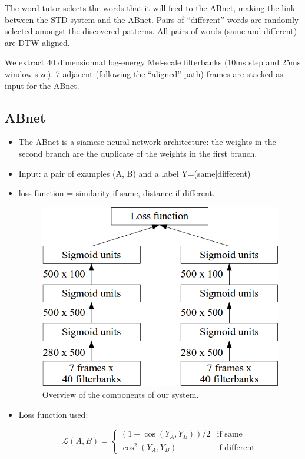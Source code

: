 \documentclass[final]{beamer}
\newcommand{\abnet}{{\sc ABnet}}
\begin{document}
\begin{frame}[t]
\begin{multicols}{3}
The word tutor selects the words that it will feed to the \abnet{}, making the link between the STD system and the \abnet{}.
Pairs of ``different'' words are randomly selected amongst the discovered patterns. All pairs of words (same and different) are DTW aligned.

We extract 40 dimensionnal log-energy Mel-scale filterbanks (10ms step and 25ms window size). 7 adjacent (following the ``aligned'' path) frames are stacked as input for the \abnet{}.

\subsection{ABnet}

\begin{itemize}
\item The \abnet{} is a siamese neural network architecture: the weights in the second branch are the duplicate of the weights in the first branch.
\item Input: a pair of examples (A, B) and a label Y=(same|different)
\item loss function = similarity if same, distance if different.

\begin{figure}[ht!]
  \begin{center}
    \includegraphics[width=0.85\columnwidth]{abnet_cropped.png}
    \caption{\label{fig:system}Overview of the components of our system.}
  \end{center}
\end{figure}

\item Loss function used:

\[
\mathcal{L}(A, B) =
\begin{cases}
(1-\cos(Y_A, Y_B)) / 2 & \text{if same} \\
\cos^2(Y_A, Y_B)       & \text{if different}
\end{cases}
\]


\end{itemize}
\end{multicols}
\end{frame}
\end{document}
